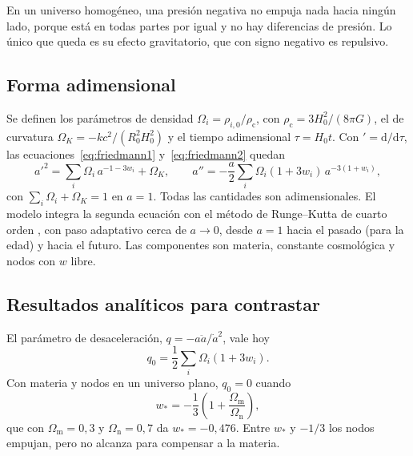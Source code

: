 \documentclass[11pt,a4paper]{article}
\begin{document}
En un universo homogéneo, una presión negativa no empuja nada hacia ningún lado, porque está en todas partes por igual y no hay diferencias de presión. Lo único que queda es su efecto gravitatorio, que con signo negativo es repulsivo.

\subsection{Forma adimensional}

Se definen los parámetros de densidad $\Omega_i = \rho_{i,0}/\rho_{\mathrm c}$, con $\rho_{\mathrm c} = 3H_0^2/(8\pi G)$, el de curvatura $\Omega_K = -kc^2/(R_0^2 H_0^2)$ y el tiempo adimensional $\tau = H_0 t$. Con $' = \mathrm d/\mathrm d\tau$, las ecuaciones~\eqref{eq:friedmann1} y~\eqref{eq:friedmann2} quedan
\begin{equation}\label{eq:adim}
a'^2 = \sum_i \Omega_i\, a^{-1-3w_i} + \Omega_K, \qquad a'' = -\frac{a}{2}\sum_i \Omega_i (1 + 3w_i)\, a^{-3(1+w_i)},
\end{equation}
con $\sum_i \Omega_i + \Omega_K = 1$ en $a = 1$. Todas las cantidades son adimensionales. El modelo integra la segunda ecuación con el método de Runge--Kutta de cuarto orden \parencite{runge1895}, con paso adaptativo cerca de $a \to 0$, desde $a = 1$ hacia el pasado (para la edad) y hacia el futuro. Las componentes son materia, constante cosmológica y nodos con $w$ libre.

\subsection{Resultados analíticos para contrastar}

El parámetro de desaceleración, $q = -a\ddot a/\dot a^2$, vale hoy
\begin{equation}\label{eq:q0}
q_0 = \frac12 \sum_i \Omega_i (1 + 3w_i).
\end{equation}
Con materia y nodos en un universo plano, $q_0 = 0$ cuando
\begin{equation}\label{eq:wcero}
w_* = -\frac13\left(1 + \frac{\Omega_{\mathrm m}}{\Omega_{\mathrm n}}\right),
\end{equation}
que con $\Omega_{\mathrm m} = 0{,}3$ y $\Omega_{\mathrm n} = 0{,}7$ da $w_* = -0{,}476$. Entre $w_*$ y $-1/3$ los nodos empujan, pero no alcanza para compensar a la materia.
\end{document}
